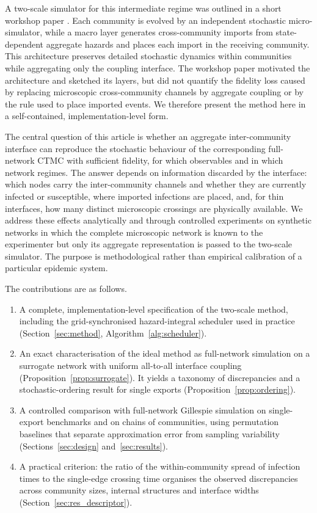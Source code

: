 \documentclass[a4paper,fleqn]{cas-sc}
\begin{document}
A two-scale simulator for this intermediate regime was outlined in a short workshop paper \citep{kuryliak2025towards}. Each community is evolved by an independent stochastic micro-simulator, while a macro layer generates cross-community imports from state-dependent aggregate hazards and places each import in the receiving community. This architecture preserves detailed stochastic dynamics within communities while aggregating only the coupling interface. The workshop paper motivated the architecture and sketched its layers, but did not quantify the fidelity loss caused by replacing microscopic cross-community channels by aggregate coupling or by the rule used to place imported events. We therefore present the method here in a self-contained, implementation-level form.

The central question of this article is whether an aggregate inter-community interface can reproduce the stochastic behaviour of the corresponding full-network CTMC with sufficient fidelity, for which observables and in which network regimes. The answer depends on information discarded by the interface: which nodes carry the inter-community channels and whether they are currently infected or susceptible, where imported infections are placed, and, for thin interfaces, how many distinct microscopic crossings are physically available. We address these effects analytically and through controlled experiments on synthetic networks in which the complete microscopic network is known to the experimenter but only its aggregate representation is passed to the two-scale simulator. The purpose is methodological rather than empirical calibration of a particular epidemic system.

The contributions are as follows.
\begin{enumerate}
\item A complete, implementation-level specification of the two-scale method, including the grid-synchronised hazard-integral scheduler used in practice (Section~\ref{sec:method}, Algorithm~\ref{alg:scheduler}).
\item An exact characterisation of the ideal method as full-network simulation on a surrogate network with uniform all-to-all interface coupling (Proposition~\ref{prop:surrogate}). It yields a taxonomy of discrepancies and a stochastic-ordering result for single exports (Proposition~\ref{prop:ordering}).
\item A controlled comparison with full-network Gillespie simulation on single-export benchmarks and on chains of communities, using permutation baselines that separate approximation error from sampling variability (Sections~\ref{sec:design} and~\ref{sec:results}).
\item A practical criterion: the ratio of the within-community spread of infection times to the single-edge crossing time organises the observed discrepancies across community sizes, internal structures and interface widths (Section~\ref{sec:res_descriptor}).
\end{enumerate}
\end{document}
